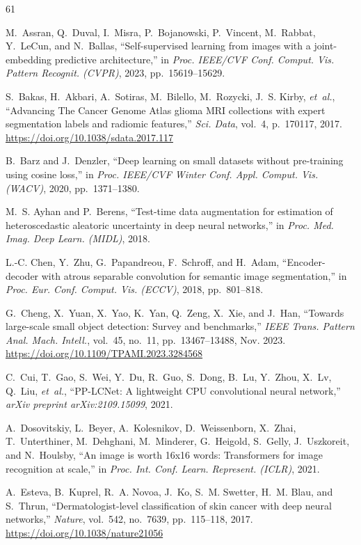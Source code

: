 ﻿\documentclass[journal]{IEEEtran}
\providecommand{\doi}[1]{\url{https://doi.org/#1}}
\begin{document}
\begin{thebibliography}{61}

M.~Assran, Q.~Duval, I.~Misra, P.~Bojanowski, P.~Vincent, M.~Rabbat, Y.~LeCun, and N.~Ballas, ``Self-supervised learning from images with a joint-embedding predictive architecture,'' in \emph{Proc. IEEE/CVF Conf. Comput. Vis. Pattern Recognit. (CVPR)}, 2023, pp.~15619--15629.

S.~Bakas, H.~Akbari, A.~Sotiras, M.~Bilello, M.~Rozycki, J.~S. Kirby, \emph{et~al.}, ``Advancing The Cancer Genome Atlas glioma MRI collections with expert segmentation labels and radiomic features,'' \emph{Sci. Data}, vol.~4, p.~170117, 2017. \doi{10.1038/sdata.2017.117}

B.~Barz and J.~Denzler, ``Deep learning on small datasets without pre-training using cosine loss,'' in \emph{Proc. IEEE/CVF Winter Conf. Appl. Comput. Vis. (WACV)}, 2020, pp.~1371--1380.

M.~S. Ayhan and P.~Berens, ``Test-time data augmentation for estimation of heteroscedastic aleatoric uncertainty in deep neural networks,'' in \emph{Proc. Med. Imag. Deep Learn. (MIDL)}, 2018.

L.-C. Chen, Y.~Zhu, G.~Papandreou, F.~Schroff, and H.~Adam, ``Encoder-decoder with atrous separable convolution for semantic image segmentation,'' in \emph{Proc. Eur. Conf. Comput. Vis. (ECCV)}, 2018, pp.~801--818.

G.~Cheng, X.~Yuan, X.~Yao, K.~Yan, Q.~Zeng, X.~Xie, and J.~Han, ``Towards large-scale small object detection: Survey and benchmarks,'' \emph{IEEE Trans. Pattern Anal. Mach. Intell.}, vol.~45, no.~11, pp.~13467--13488, Nov. 2023. \doi{10.1109/TPAMI.2023.3284568}

C.~Cui, T.~Gao, S.~Wei, Y.~Du, R.~Guo, S.~Dong, B.~Lu, Y.~Zhou, X.~Lv, Q.~Liu, \emph{et~al.}, ``PP-LCNet: A lightweight CPU convolutional neural network,'' \emph{arXiv preprint arXiv:2109.15099}, 2021.

A.~Dosovitskiy, L.~Beyer, A.~Kolesnikov, D.~Weissenborn, X.~Zhai, T.~Unterthiner, M.~Dehghani, M.~Minderer, G.~Heigold, S.~Gelly, J.~Uszkoreit, and N.~Houlsby, ``An image is worth 16x16 words: Transformers for image recognition at scale,'' in \emph{Proc. Int. Conf. Learn. Represent. (ICLR)}, 2021.

A.~Esteva, B.~Kuprel, R.~A. Novoa, J.~Ko, S.~M. Swetter, H.~M. Blau, and S.~Thrun, ``Dermatologist-level classification of skin cancer with deep neural networks,'' \emph{Nature}, vol.~542, no.~7639, pp.~115--118, 2017. \doi{10.1038/nature21056}


\end{thebibliography}
\end{document}
